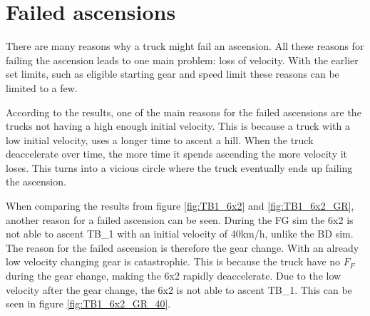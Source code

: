 \documentclass[noprint]{uit-thesis}
\begin{document}
\section{Failed ascensions}
There are many reasons why a truck might fail an ascension. All these reasons for failing the ascension leads to one main problem: loss of velocity. With the earlier set limits, such as eligible starting gear and speed limit these reasons can be limited to a few. 
\par
According to the results, one of the main reasons for the failed ascensions are the trucks not having a high enough initial velocity. This is because a truck with a low initial velocity, uses a longer time to ascent a hill. When the truck deaccelerate over time, the more time it spends ascending the more velocity it loses. This turns into a vicious circle where the truck eventually ends up failing the ascension.
\par
When comparing the results from figure \ref{fig:TB1_6x2} and \ref{fig:TB1_6x2_GR}, another reason for a failed ascension can be seen. During the FG sim the 6x2 is not able to ascent TB\_1 with an initial velocity of 40km/h, unlike the BD sim. The reason for the failed ascension is therefore the gear change. With an already low velocity changing gear is catastrophic. This is because the truck have no $F_F$ during the gear change, making the 6x2 rapidly deaccelerate. Due to the low velocity after the gear change, the 6x2 is not able to ascent TB\_1. This can be seen in figure \ref{fig:TB1_6x2_GR_40}.
\par
\end{document}
